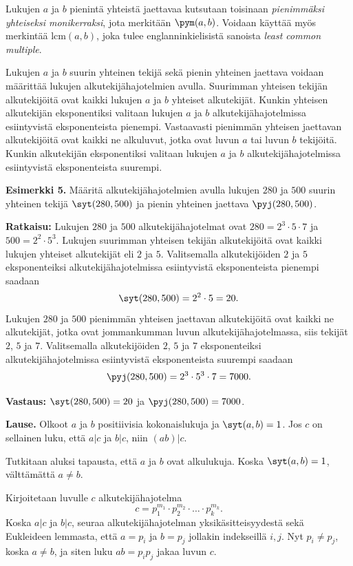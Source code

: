 Lukujen $a$ ja $b$ pienintä yhteistä jaettavaa kutsutaan toisinaan {\em pienimmäksi yhteiseksi monikerraksi}, jota merkitään $\pym(a,b)$. Voidaan käyttää myös merkintää $\mathrm{lcm}(a,b)$, joka tulee englanninkielisistä sanoista {\em least common multiple}.

Lukujen $a$ ja $b$ suurin yhteinen tekijä sekä pienin yhteinen jaettava voidaan määrittää lukujen alkutekijähajotelmien avulla. Suurimman yhteisen tekijän alkutekijöitä ovat kaikki lukujen $a$ ja $b$ yhteiset alkutekijät. Kunkin yhteisen alkutekijän eksponentiksi valitaan lukujen $a$ ja $b$ alkutekijähajotelmissa esiintyvistä eksponenteista pienempi. Vastaavasti pienimmän yhteisen jaettavan alkutekijöitä ovat kaikki ne alkuluvut, jotka ovat luvun $a$ tai luvun $b$ tekijöitä. Kunkin alkutekijän eksponentiksi valitaan lukujen $a$ ja $b$ alkutekijähajotelmissa esiintyvistä eksponenteista suurempi.

{\bf Esimerkki 5.}
Määritä alkutekijähajotelmien avulla lukujen $280$ ja $500$
suurin yhteinen tekijä $\syt(280, 500)$ ja pienin yhteinen
jaettava $\pyj(280, 500)$.

{\bf Ratkaisu:}
Lukujen $280$ ja $500$ alkutekijähajotelmat ovat $280 = 2^3
\cdot 5\cdot 7$ ja $500 = 2^2\cdot 5^3$. Lukujen suurimman
yhteisen tekijän alkutekijöitä ovat kaikki lukujen yhteiset
alkutekijät eli $2$ ja $5$. Valitsemalla alkutekijöiden $2$
ja $5$ eksponenteiksi alkutekijähajotelmissa esiintyvistä
eksponenteista pienempi saadaan
\[
\syt(280, 500) = 2^2 \cdot 5 = 20.
\]
Lukujen $280$ ja $500$ pienimmän yhteisen jaettavan alkutekijöitä
ovat kaikki ne alkutekijät, jotka ovat jommankumman luvun
alkutekijähajotelmassa, siis tekijät $2$, $5$ ja $7$.
Valitsemalla alkutekijöiden $2$, $5$ ja $7$ eksponenteiksi
alkutekijähajotelmissa esiintyvistä eksponenteista suurempi
saadaan
\[
\pyj(280, 500) = 2^3\cdot 5^3 \cdot 7 = 7000.
\]

{\bf Vastaus:} $\syt(280, 500) = 20$ ja $\pyj(280, 500) = 7000$.

{\bf Lause.} Olkoot $a$ ja $b$ positiivisia kokonaislukuja ja $\syt(a,b)=1$. Jos $c$ on sellainen luku, että $a|c$ ja $b|c$, niin $(ab) | c$.

\proof
Tutkitaan aluksi tapausta, että $a$ ja $b$ ovat alkulukuja. Koska $\syt(a,b)=1$, välttämättä $a\neq b$.

Kirjoitetaan luvulle $c$ alkutekijähajotelma
\[
c=  p_1^{m_1} \cdot p_2^{m_2} \cdot \ldots \cdot p_k^{m_k}.
\]
Koska $a|c$ ja $b|c$, seuraa alkutekijähajotelman yksikäsitteisyydestä sekä Eukleideen lemmasta, että $a=p_i$ ja $b=p_j$ jollakin indekseillä $i,j$. Nyt $p_i\neq p_j$, koska $a\neq b$, ja siten luku $ab=p_ip_j$ jakaa luvun $c$.

